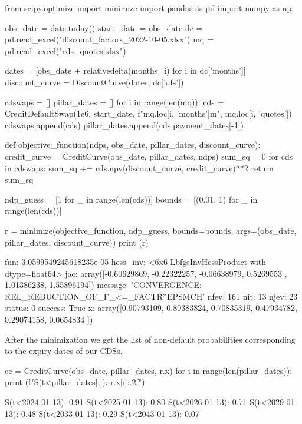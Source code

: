 \begin{ipython}
from scipy.optimize import minimize
import pandas as pd
import numpy as np

obs_date = date.today()
start_date = obs_date
dc = pd.read_excel("discount_factors_2022-10-05.xlsx")
mq = pd.read_excel("cds_quotes.xlsx")

dates = [obs_date + relativedelta(months=i) for i in dc['months']]
discount_curve = DiscountCurve(dates, dc['dfs'])

cdswaps = []
pillar_dates = []
for i in range(len(mq)):
    cds = CreditDefaultSwap(1e6, start_date,
                            f"{mq.loc[i, 'months']}m",
                            mq.loc[i, 'quotes'])
    cdswaps.append(cds)
    pillar_dates.append(cds.payment_dates[-1])

def objective_function(ndps, obs_date, pillar_dates, discount_curve):
	credit_curve = CreditCurve(obs_date, pillar_dates, ndps)
    sum_sq = 0
    for cds in cdswaps:
        sum_sq += cds.npv(discount_curve, credit_curve)**2
    return sum_sq

ndp_guess = [1 for _ in range(len(cds))]
bounds = [(0.01, 1) for _ in range(len(cds))]

r = minimize(objective_function, ndp_guess, bounds=bounds, 
             args=(obs_date, pillar_dates, discount_curve))
print (r)
\end{ipython}
\begin{ioutput}
      fun: 3.0599549245618235e-05
 hess_inv: <6x6 LbfgsInvHessProduct with dtype=float64>
      jac: array([-0.60629869, -0.22322257, -0.06638979,  0.5269553 ,  1.01386238,
        1.55896194])
  message: 'CONVERGENCE: REL_REDUCTION_OF_F_<=_FACTR*EPSMCH'
     nfev: 161
      nit: 13
     njev: 23
   status: 0
  success: True
        x: array([0.90793109, 0.80383824, 0.70835319, 0.47934782, 0.29074158,
       0.0654834 ])
\end{ioutput}

After the minimization we get the list of non-default probabilities corresponding to the expiry dates of our CDSs.

\begin{ipython}
cc = CreditCurve(obs_date, pillar_dates, r.x)
for i in range(len(pillar_dates)):
    print (f"S(t<{pillar_dates[i]}): {r.x[i]:.2f}")
\end{ipython}
\begin{ioutput}
S(t<2024-01-13): 0.91
S(t<2025-01-13): 0.80
S(t<2026-01-13): 0.71
S(t<2029-01-13): 0.48
S(t<2033-01-13): 0.29
S(t<2043-01-13): 0.07
\end{ioutput}

